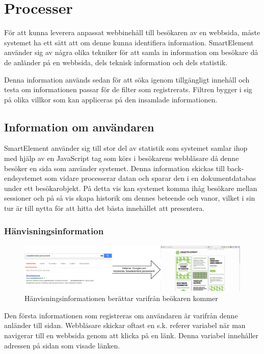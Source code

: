\section{Processer}

För att kunna leverera anpassat webbinehåll till besökaren av en webbsida, måste systemet ha ett sätt att om denne kunna identifiera information. SmartElement använder sig av några olika tekniker för att samla in information om besökare då de anländer på en webbsida, dels teknisk information och dels statistik.

Denna information används sedan för att söka igenom tillgängligt innehåll och testa om informationen passar för de filter som registrerats. Filtren bygger i sig på olika villkor som kan appliceras på den insamlade informationen.

\subsection{Information om användaren}

SmartElement använder sig till stor del av statistik som systemet samlar ihop med hjälp av en JavaScript tag som körs i besökarens webbläsare då denne besöker en sida som använder systemet. Denna information skickas till back-endsystemet som vidare processerar datan och sparar den i en dokumentdatabas under ett besökarobjekt. På detta vis kan systemet komma ihåg besökare mellan sessioner och på så vis skapa historik om dennes beteende och vanor, vilket i sin tur är till nytta för att hitta det bästa innehållet att presentera.

\subsubsection{Hänvisningsinformation}

\begin{figure}[h!]
\centering
\includegraphics[width=150mm]{assets/images/smelereferer.png}
\caption{Hänvisningsinformationen berättar varifrån beökaren kommer}
\label{referer}
\end{figure}

Den första informationen som registreras om användaren är varifrån denne anländer till sidan. Webbläsare skickar oftast en s.k. referer variabel när man navigerar till en webbsida genom att klicka på en länk. Denna variabel innehåller adressen på sidan som visade länken.

